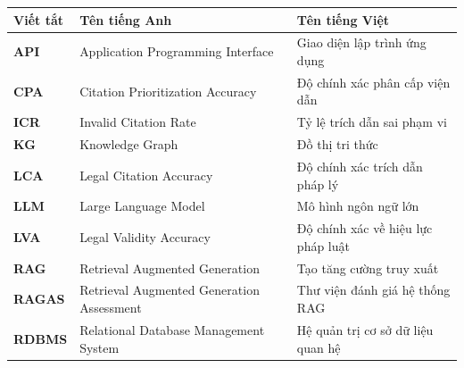 \documentclass[../DoAn.tex]{subfiles}
\begin{document}
\begin{longtable}{l p{6.6cm} p{6.5cm}}
	\hline
   \textbf{Viết tắt}  & \textbf{Tên tiếng Anh}	& \textbf{Tên tiếng Việt} \\ \hline 
	\textbf{API} & Application Programming Interface & Giao diện lập trình ứng dụng\\
	\textbf{CPA} & Citation Prioritization Accuracy & Độ chính xác phân cấp viện dẫn\\
	\textbf{ICR} & Invalid Citation Rate & Tỷ lệ trích dẫn sai phạm vi\\
	\textbf{KG} & Knowledge Graph & Đồ thị tri thức\\
	\textbf{LCA} & Legal Citation Accuracy & Độ chính xác trích dẫn pháp lý\\
	\textbf{LLM} & Large Language Model & Mô hình ngôn ngữ lớn\\
	\textbf{LVA} & Legal Validity Accuracy & Độ chính xác về hiệu lực pháp luật\\
	\textbf{RAG} & Retrieval Augmented Generation & Tạo tăng cường truy xuất\\
	\textbf{RAGAS} & Retrieval Augmented Generation Assessment & Thư viện đánh giá hệ thống RAG\\
	\textbf{RDBMS} & Relational Database Management System & Hệ quản trị cơ sở dữ liệu quan hệ\\
    \hline
\end{longtable}
\end{document}
